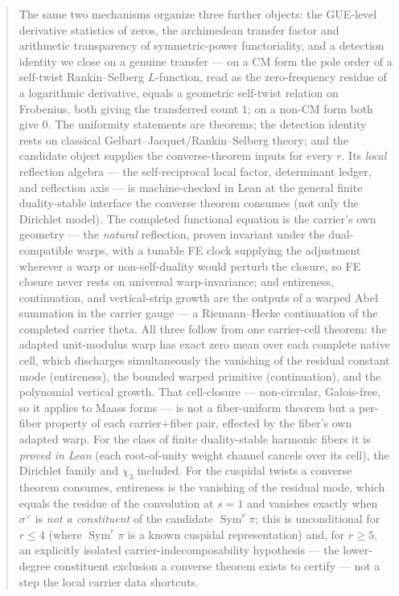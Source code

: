 \documentclass[11pt]{article}
\theoremstyle{definition}
\newcommand{\Sym}{\operatorname{Sym}}
\begin{document}
\begin{abstract}
The same two mechanisms organize three further objects: the GUE-level derivative statistics of zeros,
the archimedean transfer factor and arithmetic transparency of symmetric-power functoriality, and a
detection identity we close on a genuine transfer --- on a CM form the pole order of a self-twist
Rankin--Selberg $L$-function, read as the zero-frequency residue of a logarithmic derivative, equals a
geometric self-twist relation on Frobenius, both giving the transferred count $1$; on a non-CM form
both give $0$. The uniformity statements are theorems; the detection identity rests on classical
Gelbart--Jacquet/Rankin--Selberg theory; and the candidate object supplies the converse-theorem inputs
for every $r$. Its \emph{local} reflection algebra --- the self-reciprocal local factor, determinant
ledger, and reflection axis --- is machine-checked in Lean at the general finite duality-stable interface
the converse theorem consumes (not only the Dirichlet model). The completed functional equation is the
carrier's own geometry --- the \emph{natural} reflection, proven invariant under the dual-compatible warps,
with a tunable FE clock supplying the adjustment wherever a warp or non-self-duality would perturb the
closure, so FE closure never rests on universal warp-invariance; and entireness, continuation, and
vertical-strip growth are the outputs of a warped Abel summation in the carrier gauge --- a Riemann--Hecke
continuation of the completed carrier theta. All three follow from one carrier-cell theorem: the adapted
unit-modulus warp has exact zero mean over each complete native cell, which discharges simultaneously the
vanishing of the residual constant mode (entireness), the bounded warped primitive (continuation), and the
polynomial vertical growth. That cell-closure --- non-circular, Galois-free, so it applies to Maass forms --- is not a fiber-uniform
theorem but a per-fiber property of each carrier$+$fiber pair, effected by the fiber's own adapted warp.
For the class of finite duality-stable harmonic fibers it is \emph{proved in Lean} (each root-of-unity
weight channel cancels over its cell), the Dirichlet family and $\chi_3$ included. For the cuspidal twists a
converse theorem consumes, entireness is the vanishing of the residual mode, which equals the residue of the
convolution at $s=1$ and vanishes exactly when $\sigma^{\vee}$ is \emph{not a constituent} of the candidate
$\Sym^r\pi$; this is unconditional for $r\le4$ (where $\Sym^r\pi$ is a known cuspidal representation) and,
for $r\ge5$, an explicitly isolated carrier-indecomposability hypothesis --- the lower-degree constituent
exclusion a converse theorem exists to certify --- not a step the local carrier data shortcuts.
\end{abstract}
\end{document}
